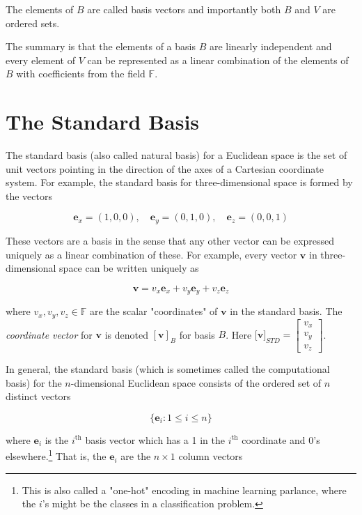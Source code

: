 \documentclass[11pt, oneside]{article}   	%
\begin{document}
\bigskip
\noindent
The elements of $B$  are called basis vectors and importantly both $B$ and $V$ are ordered sets.


\bigskip
\noindent
The summary is that the elements of a basis $B$ are linearly independent and every element of $V$ can be represented as a linear combination 
of the elements of $B$ with coefficients from the field $\mathbb{F}$. 

\section{The Standard Basis}
The standard basis (also called natural basis) for a Euclidean space is the set of unit vectors pointing in the direction of the axes of a Cartesian coordinate system.
For example, the standard basis for three-dimensional space is formed by the vectors

\begin{equation*}
\mathbf{e}_{x} = (1,0,0),\quad \mathbf{e}_{y} = (0,1,0), \quad \mathbf{e}_{z} = (0,0,1)
\end{equation*}

\bigskip
\noindent
These vectors are a basis in the sense that any other vector can be expressed uniquely as a linear combination of these. 
For example, every vector $\mathbf{v}$ in three-dimensional space can be written uniquely as

\begin{equation*}
\mathbf{v} = v_{x} \mathbf {e} _{x} + v_{y}\mathbf {e} _{y} + v_{z}\mathbf {e}_{z}
\end{equation*}

\bigskip
\noindent
where  $v_x, v_y, v_z \in \mathbb{F}$  are the scalar "coordinates" of $\mathbf{v}$ in the standard basis. The \emph{coordinate vector} for $\mathbf{v}$ is denoted
$[\mathbf{v}]_B$ for basis $B$. Here  $[\mathbf{v]}_{STD} = \begin{bmatrix} v_x \\ v_y \\ v_z \end{bmatrix}$.

\bigskip
\noindent
In general,  the standard basis (which is sometimes called the computational basis)  for the $n$-dimensional Euclidean space consists of the ordered set
of $n$ distinct vectors

\begin{equation*}
\{\mathbf {e} _{i}: 1 \leq i \leq n\}
\end{equation*}

\bigskip
\noindent
where $\mathbf{e}_i$ is the $i^\text{th}$ basis vector which has a 1 in the $i^\text{th}$ coordinate and 0's elsewhere.\footnote{This is also called a "one-hot" 
encoding in machine learning parlance, where the $i$'s might be the classes in a classification problem.}
That is, the $\mathbf{e}_i$ are the $n \times 1$ column vectors 
\end{document}
